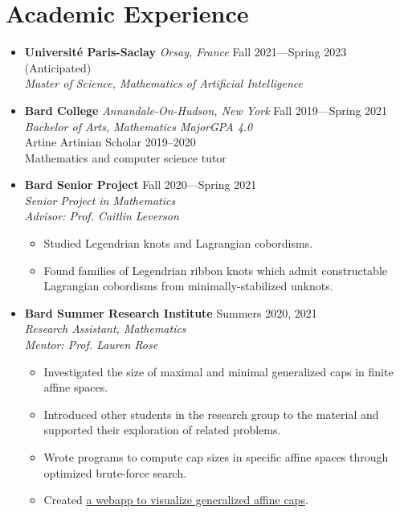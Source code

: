 \documentclass[12pt,letterpaper]{article}
\newenvironment{explist}
{\begin{itemize}[label=\textbf{--},itemsep=1pt,topsep=0pt,partopsep=0pt,parsep=0pt]}
{\end{itemize}}
\begin{document}
\section*{Academic Experience}
\begin{itemize}[label=]
    \item
        \textbf{Université Paris-Saclay} \textit{Orsay, France} \hfill Fall 2021---Spring 2023 (Anticipated)\\
        \textit{Master of Science, Mathematics of Artificial Intelligence}

	\item
	\textbf{Bard College} \textit{Annandale-On-Hudson, New York} \hfill Fall 2019---Spring 2021\\
    \textit{Bachelor of Arts, Mathematics Major}\hfill \textit{GPA 4.0}\\
    Artine Artinian Scholar 2019--2020\\
    Mathematics and computer science tutor

    \item
    \textbf{Bard Senior Project} \hfill Fall 2020---Spring 2021\\
    \textit{Senior Project in Mathematics}\\
    \textit{Advisor: Prof. Caitlin Leverson}
    \begin{explist}
        \item Studied Legendrian knots and Lagrangian cobordisms.
        \item Found families of Legendrian ribbon knots which admit constructable Lagrangian cobordisms from minimally-stabilized unknots.
    \end{explist}

    \item
    \textbf{Bard Summer Research Institute} \hfill Summers 2020, 2021\\
    \textit{Research Assistant, Mathematics}\\
    \textit{Mentor: Prof. Lauren Rose}
    \begin{explist}
        \item Investigated the size of maximal and minimal generalized caps in finite affine spaces.
        \item Introduced other students in the research group to the material and supported their exploration of related problems.
        \item Wrote programs to compute cap sizes in specific affine spaces through optimized brute-force search.
        \item Created \href{https://slickytail.github.io/QuadsVis/index.html}{a webapp to visualize generalized affine caps}.
    \end{explist}


\end{itemize}
\end{document}
